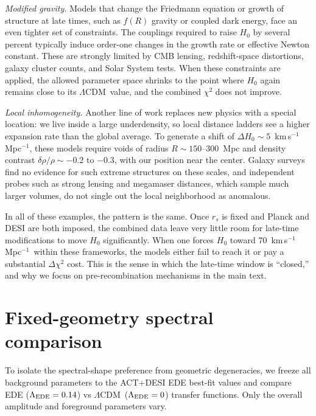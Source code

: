 \documentclass[twocolumn,showpacs,preprintnumbers,amsmath,amssymb,prd]{revtex4-2}
\newcommand{\lcdm}{$\Lambda$CDM}
\newcommand{\kms}{km\,s$^{-1}$\,Mpc$^{-1}$}
\begin{document}
\emph{Modified gravity.} Models that change the Friedmann equation or growth of 
structure at late times, such as $f(R)$ gravity or coupled dark energy, face an 
even tighter set of constraints. The couplings required to raise $H_0$ by several 
percent typically induce order-one changes in the growth rate or effective Newton 
constant. These are strongly limited by CMB lensing, redshift-space distortions, 
galaxy cluster counts, and Solar System tests. When these constraints are applied, 
the allowed parameter space shrinks to the point where $H_0$ again remains close 
to its \lcdm\ value, and the combined $\chi^2$ does not improve.

\emph{Local inhomogeneity.} Another line of work replaces new physics with a 
special location: we live inside a large underdensity, so local distance ladders 
see a higher expansion rate than the global average. To generate a shift of 
$\Delta H_0 \sim 5$~\kms, these models require voids of radius 
$R \sim 150$--300~Mpc and density contrast $\delta\rho/\rho \sim -0.2$ to $-0.3$, 
with our position near the center. Galaxy surveys find no evidence for such extreme 
structures on these scales, and independent probes such as strong lensing and 
megamaser distances, which sample much larger volumes, do not single out the local 
neighborhood as anomalous.

In all of these examples, the pattern is the same. Once $r_s$ is fixed and Planck 
and DESI are both imposed, the combined data leave very little room for late-time 
modifications to move $H_0$ significantly. When one forces $H_0$ toward 
70~\kms\ within these frameworks, the models either fail to 
reach it or pay a substantial $\Delta\chi^2$ cost. This is the sense in which the 
late-time window is ``closed,'' and why we focus on pre-recombination mechanisms in 
the main text.

\section{Fixed-geometry spectral comparison}
\label{app:fixedgeom}

To isolate the spectral-shape preference from geometric degeneracies, we freeze 
all background parameters to the ACT+DESI EDE best-fit values and compare 
EDE ($\Lambda_{\rm EDE} = 0.14$) vs \lcdm\ ($\Lambda_{\rm EDE} = 0$) transfer 
functions. Only the overall amplitude and foreground parameters vary.
\end{document}
